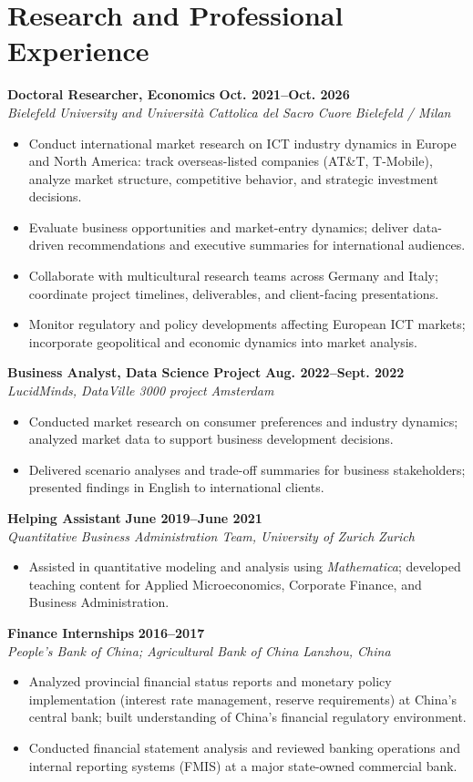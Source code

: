 \documentclass[a4paper,11pt]{article}
\newcommand{\role}[4]{%
  \textbf{#1} \hfill \textbf{#2}\\
  \textit{#3} \hfill \textit{#4}\par
}
\begin{document}
\section{Research and Professional Experience}
\role{Doctoral Researcher, Economics}{Oct. 2021--Oct. 2026}{Bielefeld University and Universit\`a Cattolica del Sacro Cuore}{Bielefeld / Milan}
\begin{itemize}
  \item Conduct international market research on ICT industry dynamics in Europe and North America: track overseas-listed companies (AT\&T, T-Mobile), analyze market structure, competitive behavior, and strategic investment decisions.
  \item Evaluate business opportunities and market-entry dynamics; deliver data-driven recommendations and executive summaries for international audiences.
  \item Collaborate with multicultural research teams across Germany and Italy; coordinate project timelines, deliverables, and client-facing presentations.
  \item Monitor regulatory and policy developments affecting European ICT markets; incorporate geopolitical and economic dynamics into market analysis.
\end{itemize}

\role{Business Analyst, Data Science Project}{Aug. 2022--Sept. 2022}{LucidMinds, DataVille 3000 project}{Amsterdam}
\begin{itemize}
  \item Conducted market research on consumer preferences and industry dynamics; analyzed market data to support business development decisions.
  \item Delivered scenario analyses and trade-off summaries for business stakeholders; presented findings in English to international clients.
\end{itemize}

\role{Helping Assistant}{June 2019--June 2021}{Quantitative Business Administration Team, University of Zurich}{Zurich}
\begin{itemize}
  \item Assisted in quantitative modeling and analysis using \textit{Mathematica}; developed teaching content for Applied Microeconomics, Corporate Finance, and Business Administration.
\end{itemize}

\role{Finance Internships}{2016--2017}{People's Bank of China; Agricultural Bank of China}{Lanzhou, China}
\begin{itemize}
  \item Analyzed provincial financial status reports and monetary policy implementation (interest rate management, reserve requirements) at China's central bank; built understanding of China's financial regulatory environment.
  \item Conducted financial statement analysis and reviewed banking operations and internal reporting systems (FMIS) at a major state-owned commercial bank.
\end{itemize}
\end{document}
